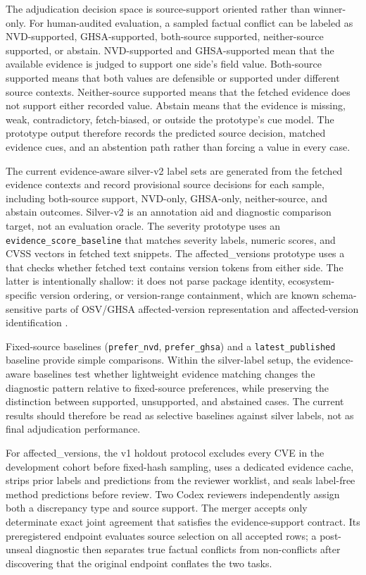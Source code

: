 The adjudication decision space is source-support oriented rather than winner-only. For human-audited evaluation, a sampled factual conflict can be labeled as NVD-supported, GHSA-supported, both-source supported, neither-source supported, or abstain. NVD-supported and GHSA-supported mean that the available evidence is judged to support one side's field value. Both-source supported means that both values are defensible or supported under different source contexts. Neither-source supported means that the fetched evidence does not support either recorded value. Abstain means that the evidence is missing, weak, contradictory, fetch-biased, or outside the prototype's cue model. The prototype output therefore records the predicted source decision, matched evidence cues, and an abstention path rather than forcing a value in every case.

The current evidence-aware silver-v2 label sets are generated from the fetched evidence contexts and record provisional source decisions for each sample, including both-source support, NVD-only, GHSA-only, neither-source, and abstain outcomes. Silver-v2 is an annotation aid and diagnostic comparison target, not an evaluation oracle. The severity prototype uses an \texttt{evidence\_score\_baseline} that matches severity labels, numeric scores, and CVSS vectors in fetched text snippets. The affected\_versions prototype uses a  that checks whether fetched text contains version tokens from either side. The latter is intentionally shallow: it does not parse package identity, ecosystem-specific version ordering, or version-range containment, which are known schema-sensitive parts of OSV/GHSA affected-version representation and affected-version identification \cite{OSVSchema2026,GHSARepo2026,Chen2025AffectedVersions}.

Fixed-source baselines (\texttt{prefer\_nvd}, \texttt{prefer\_ghsa}) and a \texttt{latest\_published} baseline provide simple comparisons. Within the silver-label setup, the evidence-aware baselines test whether lightweight evidence matching changes the diagnostic pattern relative to fixed-source preferences, while preserving the distinction between supported, unsupported, and abstained cases. The current results should therefore be read as selective baselines against silver labels, not as final adjudication performance.

For affected\_versions, the v1 holdout protocol excludes every CVE in the development cohort before fixed-hash sampling, uses a dedicated evidence cache, strips prior labels and predictions from the reviewer worklist, and seals label-free method predictions before review. Two Codex reviewers independently assign both a discrepancy type and source support. The merger accepts only determinate exact joint agreement that satisfies the evidence-support contract. Its preregistered endpoint evaluates source selection on all accepted rows; a post-unseal diagnostic then separates true factual conflicts from non-conflicts after discovering that the original endpoint conflates the two tasks.

